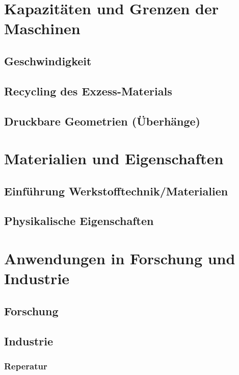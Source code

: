 \documentclass[12pt]{article}
\begin{document}

%
\pagebreak
\pagebreak
{}
\tableofcontents
\pagebreak

%
%
\section{Kapazitäten und Grenzen der Maschinen}
\subsection{Geschwindigkeit}
\subsection{Recycling des Exzess-Materials}
\subsection{Druckbare Geometrien (Überhänge)}
\section{Materialien und Eigenschaften}
\subsection{Einführung Werkstofftechnik/Materialien}
\subsection{Physikalische Eigenschaften}
%
\section{Anwendungen in Forschung und Industrie}
\subsection{Forschung}
\subsection{Industrie}
\subsubsection{Reperatur}
\end{document}
